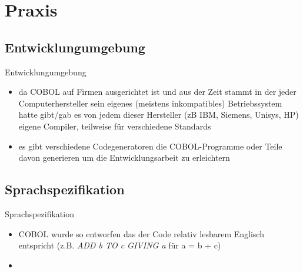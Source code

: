 \documentclass{beamer}
\begin{document}
\section{Praxis}

\subsection{Entwicklungumgebung}

\begin{frame}{Entwicklungumgebung}
	\begin{itemize}
		\item
			da COBOL auf Firmen ausgerichtet ist und aus der Zeit stammt in der jeder Computerhersteller sein eigenes (meistens inkompatibles) Betriebssystem hatte gibt/gab es von jedem dieser Hersteller (zB IBM, Siemens, Unisys, HP) eigene Compiler, teilweise f\"ur verschiedene Standards
		\item
			es gibt verschiedene Codegeneratoren die COBOL-Programme oder Teile davon generieren um die Entwicklungsarbeit zu erleichtern
	\end{itemize}
\end{frame}

\subsection{Sprachspezifikation}

\begin{frame}{Sprachspezifikation}
	\begin{itemize}
		\item
			COBOL wurde so entworfen das der Code relativ lesbarem Englisch entspricht (z.B. \emph{ADD b TO c GIVING a} f\"ur a = b + c)
		\item
	\end{itemize}
\end{frame}
\end{document}
